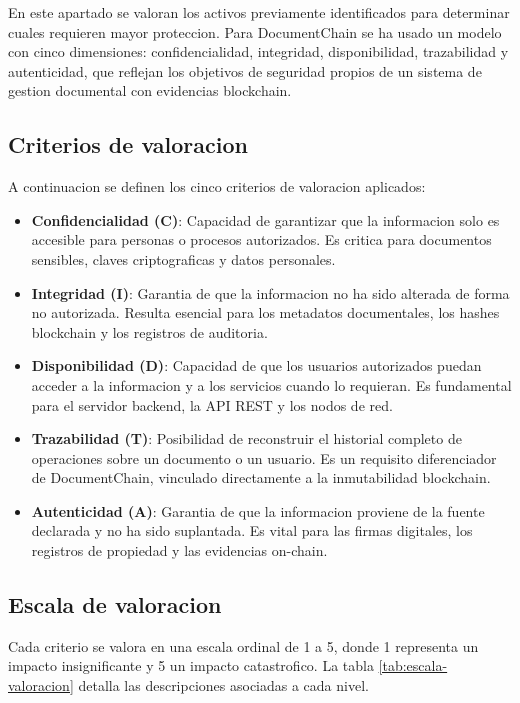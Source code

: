 \documentclass[11pt, a4paper]{article}
\begin{document}
En este apartado se valoran los activos previamente identificados para determinar cuales requieren mayor proteccion. Para DocumentChain se ha usado un modelo con cinco dimensiones: confidencialidad, integridad, disponibilidad, trazabilidad y autenticidad, que reflejan los objetivos de seguridad propios de un sistema de gestion documental con evidencias blockchain.

\subsection{Criterios de valoracion}

A continuacion se definen los cinco criterios de valoracion aplicados:

\begin{itemize}
    \item \textbf{Confidencialidad (C)}: Capacidad de garantizar que la informacion solo es accesible para personas o procesos autorizados. Es critica para documentos sensibles, claves criptograficas y datos personales.
    \item \textbf{Integridad (I)}: Garantia de que la informacion no ha sido alterada de forma no autorizada. Resulta esencial para los metadatos documentales, los hashes blockchain y los registros de auditoria.
    \item \textbf{Disponibilidad (D)}: Capacidad de que los usuarios autorizados puedan acceder a la informacion y a los servicios cuando lo requieran. Es fundamental para el servidor backend, la API REST y los nodos de red.
    \item \textbf{Trazabilidad (T)}: Posibilidad de reconstruir el historial completo de operaciones sobre un documento o un usuario. Es un requisito diferenciador de DocumentChain, vinculado directamente a la inmutabilidad blockchain.
    \item \textbf{Autenticidad (A)}: Garantia de que la informacion proviene de la fuente declarada y no ha sido suplantada. Es vital para las firmas digitales, los registros de propiedad y las evidencias on-chain.
\end{itemize}

\subsection{Escala de valoracion}

Cada criterio se valora en una escala ordinal de 1 a 5, donde 1 representa un impacto insignificante y 5 un impacto catastrofico. La tabla \ref{tab:escala-valoracion} detalla las descripciones asociadas a cada nivel.
\end{document}
